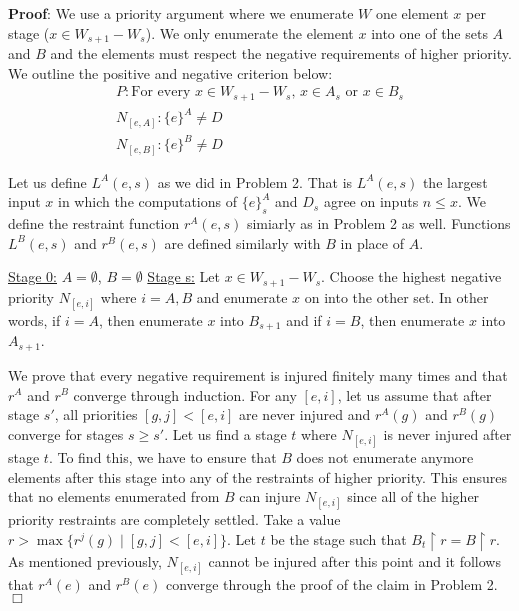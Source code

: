\documentclass[11pt]{article}
\def\endproofmark{$\Box$}
\newenvironment{proof}{\par{\bf Proof}:}{\endproofmark\smallskip}
\begin{document}
\begin{proof}
 We use a priority argument where we enumerate $W$ one element $x$ per stage ($x \in W_{s+1} - W_s$). We only enumerate the element $x$ into one of the sets $A$ and $B$ and the elements must respect the negative requirements of higher priority.
 We outline the positive and negative criterion below:
 \begin{gather*}
  P: \text{For every $x \in W_{s+1} - W_s$, $x \in A_s$ or $x \in B_s$} \\
  N_{[e,A]}: \{e\}^A \neq D \\
  N_{[e,B]}: \{e\}^B \neq D
 \end{gather*}

 Let us define $L^A(e,s)$ as we did in Problem 2. That is $L^A(e,s)$ the largest input $x$ in which the computations of $\{e\}^A_s$ and $D_s$ agree on inputs $n \leq x$. We define the restraint function $r^A(e,s)$ simiarly as in Problem 2 as well. Functions $L^B(e,s)$ and $r^B(e,s)$ are defined similarly with $B$ in place of $A$. \newline
 
 \underline{Stage 0:} $A = \emptyset$, $B = \emptyset$ \newline
 \underline{Stage s:} Let $x \in W_{s+1} - W_s$. Choose the highest negative priority $N_{[e,i]}$ where $i = A,B$ and enumerate $x$ on into the other set. In other words, 
 if $i = A$, then enumerate $x$ into $B_{s+1}$ and if $i = B$, then enumerate $x$ into $A_{s+1}$. \newline
 
 We prove that every negative requirement is injured finitely many times and that $r^A$ and $r^B$ converge through induction. For any $[e,i]$, let us assume that after stage $s'$, all priorities $[g,j] < [e,i]$ are never injured and $r^A(g)$ and $r^B(g)$ converge for stages $s \geq s'$. Let us find a stage $t$ where $N_{[e,i]}$ is never injured after stage $t$. To find this, we have to ensure that
 $B$ does not enumerate anymore elements after this stage into any of the restraints of higher priority. This ensures that no elements enumerated from $B$ can injure $N_{[e,i]}$ since all of the higher priority restraints are completely settled.
 Take a value $r > \max \{r^j(g) \mid [g,j] < [e,i]\}$. Let $t$ be the stage such that $B_t \restriction r = B \restriction r$. As mentioned previously, $N_{[e,i]}$ cannot be 
 injured after this point and it follows that $r^A(e)$ and $r^B(e)$ converge through the proof of the claim in Problem 2.
\end{proof}
\end{document}
